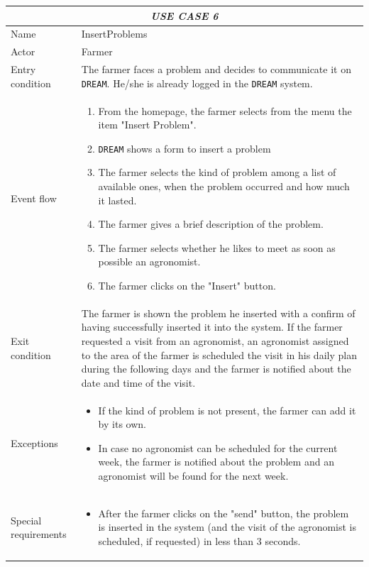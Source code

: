 \documentclass{article}
\begin{document}
\begin{longtable}{|p{3.5cm}|m{8cm}|}
 \hline
 \multicolumn{2}{|c|}{\cellcolor{white}\emph{USE CASE 6}} \\
 \endfirsthead
 \endhead
 \endfoot
 \endlastfoot
 \hline
 Name & InsertProblems\\
 \hline
 Actor & Farmer\\
 \hline
 Entry condition & The farmer faces a problem and decides to communicate it on \verb|DREAM|. He/she is already logged in the \verb|DREAM| system.\\
 \hline
 Event flow & \begin{enumerate}
    \item From the homepage, the farmer selects from the menu the item "Insert Problem".
    \item \verb|DREAM| shows a form to insert a problem
    \item The farmer selects the kind of problem among a list of available ones, when the problem occurred and how much it lasted.
    \item The farmer gives a brief description of the problem.
    \item The farmer selects whether he likes to meet as soon as possible an agronomist.
    \item The farmer clicks on the "Insert" button.
    \color{black}
 \end{enumerate}\\
 \hline
 Exit condition & The farmer is shown the problem he inserted with a confirm of having successfully inserted it into the system.
 If the farmer requested a visit from an agronomist, an agronomist assigned to the area of the farmer is scheduled the visit in his daily plan during the following days and the farmer is notified about the date and time of the visit.\\
 \hline
 Exceptions & \begin{itemize}
     \item If the kind of problem is not present, the farmer can add it by its own.
     \item In case no agronomist can be scheduled for the current week, the farmer is notified about the problem and an agronomist will be found for the next week.
 \end{itemize}\\
 \hline
 Special requirements & \begin{itemize}
     \item After the farmer clicks on the "send" button, the problem is inserted in the system (and the visit of the agronomist is scheduled, if requested) in less than 3 seconds.
 \end{itemize}\\
 \hline
\end{longtable}
\end{document}
